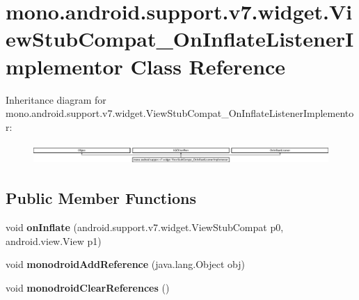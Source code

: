 \hypertarget{classmono_1_1android_1_1support_1_1v7_1_1widget_1_1_view_stub_compat___on_inflate_listener_implementor}{}\section{mono.\+android.\+support.\+v7.\+widget.\+View\+Stub\+Compat\+\_\+\+On\+Inflate\+Listener\+Implementor Class Reference}
\label{classmono_1_1android_1_1support_1_1v7_1_1widget_1_1_view_stub_compat___on_inflate_listener_implementor}
Inheritance diagram for mono.\+android.\+support.\+v7.\+widget.\+View\+Stub\+Compat\+\_\+\+On\+Inflate\+Listener\+Implementor\+:\begin{figure}[H]
\begin{center}
\leavevmode
\includegraphics[height=0.794326cm]{classmono_1_1android_1_1support_1_1v7_1_1widget_1_1_view_stub_compat___on_inflate_listener_implementor}
\end{center}
\end{figure}
\subsection*{Public Member Functions}
\begin{DoxyCompactItemize}
\item 
\mbox{\label{classmono_1_1android_1_1support_1_1v7_1_1widget_1_1_view_stub_compat___on_inflate_listener_implementor_af5dd2c498ef67b36825b1c2071bf528f}} 
void {\bfseries on\+Inflate} (android.\+support.\+v7.\+widget.\+View\+Stub\+Compat p0, android.\+view.\+View p1)
\item 
\mbox{\label{classmono_1_1android_1_1support_1_1v7_1_1widget_1_1_view_stub_compat___on_inflate_listener_implementor_ac26d53bed514e46ac48a1704e5a0f7f5}} 
void {\bfseries monodroid\+Add\+Reference} (java.\+lang.\+Object obj)
\item 
\mbox{\label{classmono_1_1android_1_1support_1_1v7_1_1widget_1_1_view_stub_compat___on_inflate_listener_implementor_abf26bd40d8c3a6339bfbc544da762a52}} 
void {\bfseries monodroid\+Clear\+References} ()
\end{DoxyCompactItemize}
